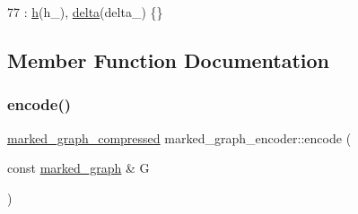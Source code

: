 \begin{DoxyCode}
77 : \hyperlink{classmarked__graph__encoder_ae7f8872c57d2d64e4ca6cc47387b9b58}{h}(h\_), \hyperlink{classmarked__graph__encoder_a29dcf42526b12cf7964a556bb1025c9b}{delta}(delta\_) \{\}
\end{DoxyCode}


\subsection{Member Function Documentation}
\mbox{\label{classmarked__graph__encoder_aa7fa19a225dd9b31d6fef9583fab8cf1}} 
\subsubsection{\texorpdfstring{encode()}{encode()}}
{\footnotesize\ttfamily \hyperlink{classmarked__graph__compressed}{marked\+\_\+graph\+\_\+compressed} marked\+\_\+graph\+\_\+encoder\+::encode (\begin{DoxyParamCaption}\item[{const \hyperlink{classmarked__graph}{marked\+\_\+graph} \&}]{G }\end{DoxyParamCaption})}


